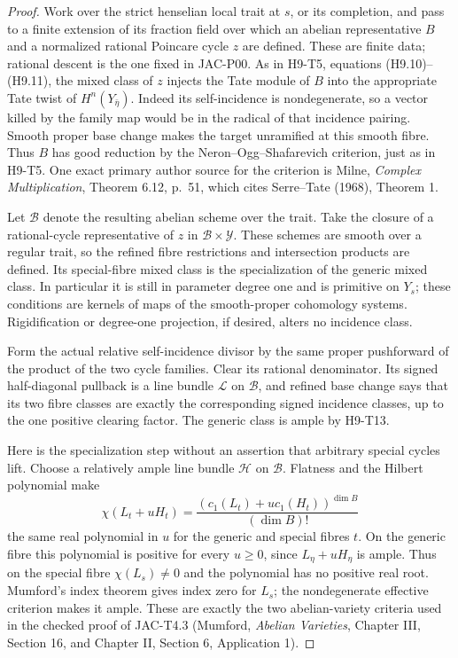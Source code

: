 \documentclass[11pt]{article}
\theoremstyle{remark}\newtheorem{remark}[theorem]{Remark}
\begin{document}
\begin{proof}
Work over the strict henselian local trait at $s$, or its completion,
and pass to a finite extension of its fraction field over which an
abelian representative $B$ and a normalized rational Poincare cycle
$z$ are defined. These are finite data; rational descent is the one
fixed in JAC-P00. As in H9-T5, equations (H9.10)--(H9.11), the
mixed class of $z$ injects the Tate module of $B$ into the appropriate
Tate twist of $H^n(Y_{\bar\eta})$. Indeed its self-incidence is
nondegenerate, so a vector killed by the family map would be in
the radical of that incidence pairing. Smooth proper base change
makes the target unramified at this smooth fibre. Thus $B$ has
good reduction by the Neron--Ogg--Shafarevich criterion, just as in
H9-T5. One exact primary author source for the criterion is Milne,
\emph{Complex Multiplication}, Theorem 6.12, p.~51, which cites
Serre--Tate (1968), Theorem 1.

Let $\mathscr B$ denote the resulting abelian scheme over the trait.
Take the closure of a rational-cycle representative of $z$ in
$\mathscr B\times\mathscr Y$. These schemes are smooth over a
regular trait, so the refined fibre restrictions and intersection
products are defined. Its special-fibre mixed class is the
specialization of the generic mixed class. In particular it is
still in parameter degree one and is primitive on $Y_s$; these
conditions are kernels of maps of the smooth-proper cohomology
systems. Rigidification or degree-one projection, if desired,
alters no incidence class.

Form the actual relative self-incidence divisor by the same proper
pushforward of the product of the two cycle families. Clear its
rational denominator. Its signed half-diagonal pullback is a line
bundle $\mathscr L$ on $\mathscr B$, and refined base change says
that its two fibre classes are exactly the corresponding signed
incidence classes, up to the one positive clearing factor. The
generic class is ample by H9-T13.

Here is the specialization step without an assertion that arbitrary
special cycles lift. Choose a relatively ample line bundle
$\mathscr H$ on $\mathscr B$. Flatness and the Hilbert polynomial
make
\[
 \chi(L_t+uH_t)=\frac{(c_1(L_t)+u c_1(H_t))^{\dim B}}{(\dim B)!}
\]
the same real polynomial in $u$ for the generic and special fibres
$t$. On the generic fibre this polynomial is positive for every
$u\geq0$, since $L_{\eta}+uH_{\eta}$ is ample. Thus on the
special fibre $\chi(L_s)\ne0$ and the polynomial has no positive
real root. Mumford's index theorem gives index zero for $L_s$;
the nondegenerate effective criterion makes it ample. These are
exactly the two abelian-variety criteria used in the checked proof
of JAC-T4.3 (Mumford, \emph{Abelian Varieties}, Chapter III,
Section 16, and Chapter II, Section 6, Application 1).


\end{proof}
\end{document}

